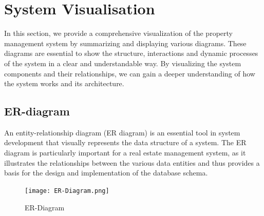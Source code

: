 \section{System Visualisation}
In this section, we provide a comprehensive visualization of the property management system by summarizing and displaying various diagrams. These diagrams are essential to show the structure, interactions and dynamic processes of the system in a clear and understandable way. By visualizing the system components and their relationships, we can gain a deeper understanding of how the system works and its architecture.
\subsection{ER-diagram}
An entity-relationship diagram (ER diagram) is an essential tool in system development that visually represents the data structure of a system. The ER diagram is particularly important for a real estate management system, as it illustrates the relationships between the various data entities and thus provides a basis for the design and implementation of the database schema.
\begin{figure}[h]
\centering
\texttt{[image: ER-Diagram.png]}
\caption{ER-Diagram}
\label{fig:ER-Diagram}
\end{figure}

\newpage
